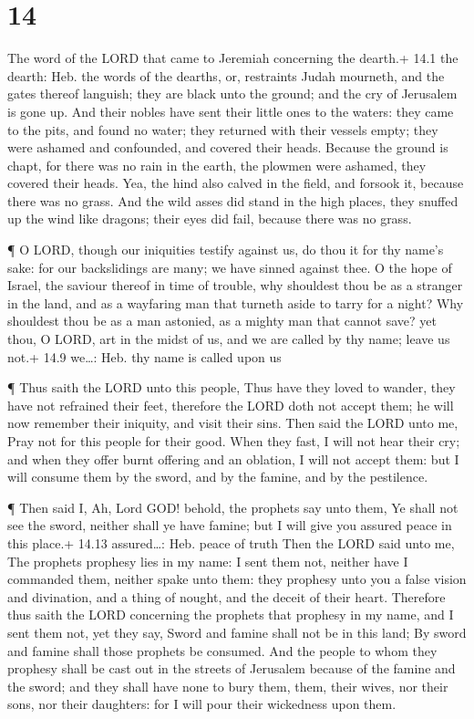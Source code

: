 \hypertarget{section-13}{%
\section{14}\label{section-13}}

 The word of the LORD that came to Jeremiah concerning the
dearth.+ 14.1 the dearth: Heb. the words of the dearths, or, restraints
 Judah mourneth, and the gates thereof languish; they are
black unto the ground; and the cry of Jerusalem is gone up. 
And their nobles have sent their little ones to the waters: they came to
the pits, and found no water; they returned with their vessels empty;
they were ashamed and confounded, and covered their heads. 
Because the ground is chapt, for there was no rain in the earth, the
plowmen were ashamed, they covered their heads.  Yea, the
hind also calved in the field, and forsook it, because there was no
grass.  And the wild asses did stand in the high places,
they snuffed up the wind like dragons; their eyes did fail, because
there was no grass.

 ¶ O LORD, though our iniquities testify against us, do thou
it for thy name's sake: for our backslidings are many; we have sinned
against thee.  O the hope of Israel, the saviour thereof in
time of trouble, why shouldest thou be as a stranger in the land, and as
a wayfaring man that turneth aside to tarry for a night? 
Why shouldest thou be as a man astonied, as a mighty man that cannot
save? yet thou, O LORD, art in the midst of us, and we are called by thy
name; leave us not.+ 14.9 we\ldots: Heb. thy name is called upon us

 ¶ Thus saith the LORD unto this people, Thus have they
loved to wander, they have not refrained their feet, therefore the LORD
doth not accept them; he will now remember their iniquity, and visit
their sins.  Then said the LORD unto me, Pray not for this
people for their good.  When they fast, I will not hear
their cry; and when they offer burnt offering and an oblation, I will
not accept them: but I will consume them by the sword, and by the
famine, and by the pestilence.

 ¶ Then said I, Ah, Lord GOD! behold, the prophets say unto
them, Ye shall not see the sword, neither shall ye have famine; but I
will give you assured peace in this place.+ 14.13 assured\ldots: Heb.
peace of truth  Then the LORD said unto me, The prophets
prophesy lies in my name: I sent them not, neither have I commanded
them, neither spake unto them: they prophesy unto you a false vision and
divination, and a thing of nought, and the deceit of their heart.
 Therefore thus saith the LORD concerning the prophets that
prophesy in my name, and I sent them not, yet they say, Sword and famine
shall not be in this land; By sword and famine shall those prophets be
consumed.  And the people to whom they prophesy shall be
cast out in the streets of Jerusalem because of the famine and the
sword; and they shall have none to bury them, them, their wives, nor
their sons, nor their daughters: for I will pour their wickedness upon
them.

